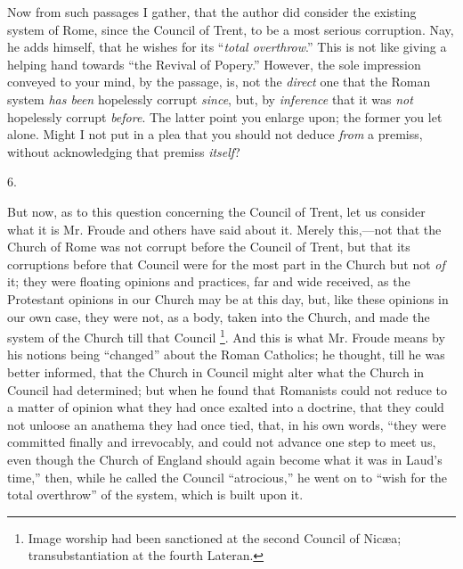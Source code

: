 Now from such passages I gather, that the author
did consider the existing system of Rome, since the Council of Trent,
to be a most serious corruption. Nay, he adds himself, that he wishes
for its ``\emph{total overthrow}.'' This is not like giving a
helping hand towards ``the Revival of Popery.'' However, the sole
impression conveyed to your mind, by the passage, is, not the \emph{direct}
one that the Roman system \emph{has been} hopelessly corrupt \emph{since},
but, by \emph{inference} that it was \emph{not} hopelessly corrupt \emph{before}.
The latter point you enlarge upon; the former you let alone. Might I
not put in a plea that you should not deduce \emph{from} a premiss,
without acknowledging that premiss \emph{itself}?

6.

But now, as to this question concerning the
Council of Trent, let us consider what it is Mr. Froude and others
have said about it. Merely this,—not that the Church of Rome was not
corrupt before the Council of Trent, but that its corruptions before
that Council were for the most part in the Church but not \emph{of}
it; they were floating opinions and practices, far and wide received,
as the Protestant opinions in our Church may be at this day, but, like
these opinions in our own case, they were not, as a body, taken into
the Church, and made the system of the Church till that Council \footnote{Image worship had been sanctioned at the second Council of Nicæa;
transubstantiation at the fourth Lateran.}. And this is what Mr. Froude means by his notions being ``changed'' about the Roman Catholics; he thought, till he was
better informed, that the Church in Council might alter what the
Church in Council had determined; but when he found that Romanists
could not reduce to a matter of opinion what they had once exalted
into a doctrine, that they could not unloose an anathema they had once
tied, that, in his own words, ``they were committed finally and
irrevocably, and could not advance one step to meet us, even though
the Church of England should again become what it was in Laud's
time,'' then, while he called the Council ``atrocious,'' he went on
to ``wish for the total overthrow'' of the system, which is built
upon it.

